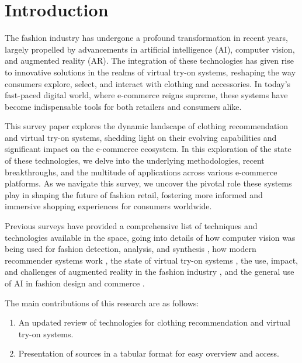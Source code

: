 \section{Introduction} \label{section:intro}
	The fashion industry has undergone a profound transformation in recent years, largely propelled by advancements in artificial intelligence (AI), computer vision, and augmented reality (AR). The integration of these technologies has given rise to innovative solutions in the realms of virtual try-on systems, reshaping the way consumers explore, select, and interact with clothing and accessories. In today's fast-paced digital world, where e-commerce reigns supreme, these systems have become indispensable tools for both retailers and consumers alike.

	This survey paper explores the dynamic landscape of clothing recommendation and virtual try-on systems, shedding light on their evolving capabilities and significant impact on the e-commerce ecosystem. In this exploration of the state of these technologies, we delve into the underlying methodologies, recent breakthroughs, and the multitude of applications across various e-commerce platforms. As we navigate this survey, we uncover the pivotal role these systems play in shaping the future of fashion retail, fostering more informed and immersive shopping experiences for consumers worldwide.

	Previous surveys have provided a comprehensive list of techniques and technologies available in the space, going into details of how computer vision was being used for fashion detection, analysis, and synthesis \cite{DBLP:journals/csur/ChengSCHL21, Jain_Wah_2022}, how modern recommender systems work \cite{DBLP:journals/corr/abs-2202-02757, DBLP:journals/sncs/ShirkhaniMSH23}, the state of virtual try-on systems \cite{DBLP:journals/corr/abs-2111-00905, DBLP:journals/mta/GhodhbaniNRA22, DBLP:journals/cvm/LiangL21}, the use, impact, and challenges of augmented reality in the fashion industry \cite{menon2020impact, jayamini2021use, DBLP:journals/corr/abs-2202-09450, huang2019enhancing, mehta2020enhancement, zak2020augmented, caboni2019augmented}, and the general use of AI in fashion design and commerce \cite{DBLP:journals/access/GiriJZB19, DBLP:journals/corr/abs-2105-03050, DBLP:journals/access/GuoZLCCW23, DBLP:journals/spm/ChenSC23, sahni2021review, liang2020implementation, sareen2022ai, 10153335, DBLP:journals/tmm/Yan0LZX0Y23}.

	The main contributions of this research are as follows:
	\begin{enumerate}
		\item An updated review of technologies for clothing recommendation and virtual try-on systems.
		\item Presentation of sources in a tabular format for easy overview and access.
	\end{enumerate}

